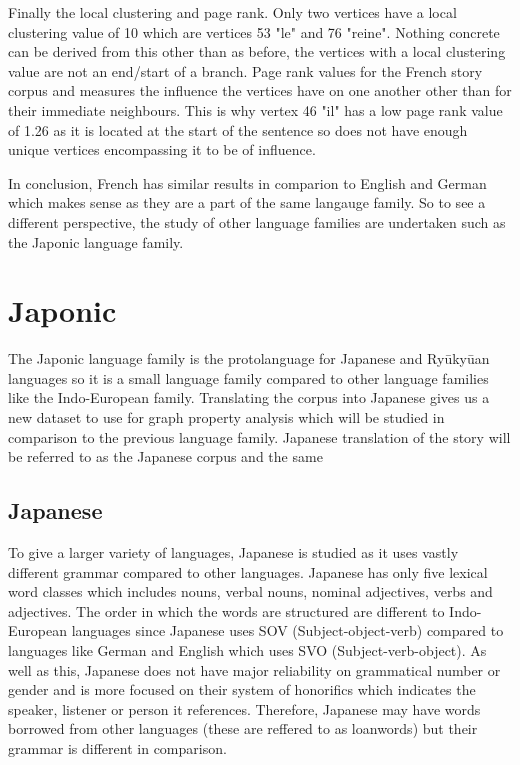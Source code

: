 Finally the local clustering and page rank. Only two vertices have a local clustering value of 10 which are vertices 53 "le" and 76 "reine". Nothing concrete can be derived from this other than as before, the vertices with a local clustering value are not an end/start of a branch. Page rank values for the French story corpus and measures the influence the vertices have on one another other than for their immediate neighbours. This is why vertex 46 "il" has a low page rank value of 1.26 as it is located at the start of the sentence so does not have enough unique vertices encompassing it to be of influence.

In conclusion, French has similar results in comparion to English and German which makes sense as they are a part of the same langauge family. So to see a different perspective, the study of other language families are undertaken such as the Japonic language family.

\section{Japonic}
The Japonic language family is the protolanguage for Japanese and Ryūkyūan languages\cite{vovin2017origins} so it is a small language family compared to other language families like the Indo-European family. Translating the corpus into Japanese gives us a new dataset to use for graph property analysis which will be studied in comparison to the previous language family. Japanese translation of the story will be referred to as the Japanese corpus and the same 
\subsection{Japanese}
To give a larger variety of languages, Japanese is studied as it uses vastly different grammar compared to other languages. Japanese has only five lexical word classes which includes nouns, verbal nouns, nominal adjectives, verbs and adjectives. The order in which the words are structured are different to Indo-European languages since Japanese uses SOV (Subject-object-verb) compared to languages like German and English which uses SVO (Subject-verb-object). As well as this, Japanese does not have major reliability on grammatical number or gender and is more focused on their system of honorifics which indicates the speaker, listener or person it references. Therefore, Japanese may have words borrowed from other languages (these are reffered to as loanwords\cite{miura1979influence}) but their grammar is different in comparison. 

